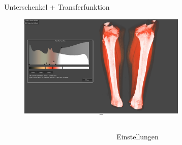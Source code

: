 \documentclass[final,hyperref={pdfpagelabels=false}]{beamer}
\begin{document}
\begin{frame}[t]
\begin{columns}[t]
\begin{column}{.465\textwidth}
\begin{block}{Unterschenkel + Transferfunktion}
    \begin{figure}
    	\center
        \includegraphics[width=0.75\textwidth]{KnieTransferfunktion}
        
    \end{figure}
   
     
   
   
\end{block}


\end{column} %



\begin{column}{.025\textwidth}\end{column} %

\end{columns} %


\begin{columns}[t] %

\begin{column}{.025\textwidth}\end{column} %

\begin{column}{.465\textwidth} %


\begin{block}{Einstellungen}


\end{block}
\end{column}
\end{columns}
\end{frame}
\end{document}
